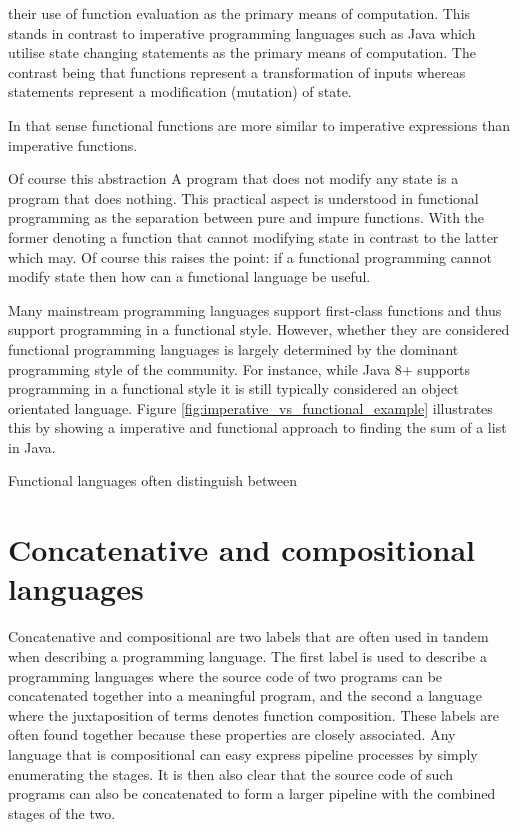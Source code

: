 their use
of function evaluation as the primary means of computation.
This stands in contrast to imperative programming languages
such as Java which utilise state changing statements as the primary means of computation. The contrast being that functions represent a transformation of inputs whereas statements represent a modification (mutation) of state. 


In that sense functional functions are more similar to imperative
expressions than imperative functions.

Of course this abstraction
A program that does not modify any state is a program that does nothing. This practical aspect is understood in functional programming as the separation between pure and impure functions. With the former denoting a function that cannot modifying state in contrast to the latter which may.
Of course this raises the point: if a functional programming cannot modify state then how can a functional language be useful.

Many mainstream programming languages support first-class functions and thus support programming in a functional style. However, whether they are considered functional programming languages is largely determined by the dominant programming style of the community. For instance, while Java 8+ supports programming in a functional style it is still typically considered an object orientated language. Figure
\ref{fig:imperative_vs_functional_example} illustrates this by showing a imperative and functional approach to finding the sum
of a list in Java.


Functional languages often distinguish between 



\section{Concatenative and compositional languages}
Concatenative and compositional are two labels that are often used in tandem when describing a programming language. The first label is used to describe a programming languages where the source code of two programs can be concatenated together into a meaningful program, and the second a language where the juxtaposition of terms denotes function composition. These labels are often found together because these properties are closely associated. Any language that is compositional can easy express pipeline processes by simply enumerating the stages. It is then also clear that the source code of such programs can also be concatenated to form a larger pipeline with the combined stages of the two.

